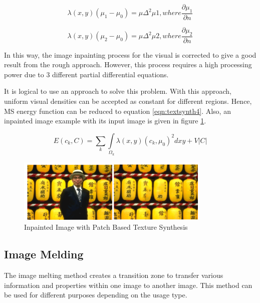 \begin{equation}
    \label{eqn:textsynth2}
    \lambda(x,y)(\mu_1-\mu_0)=\mu\Delta^2\mu1, where \frac{\partial\mu_1}{\partial n}
\end{equation}

\begin{equation}
    \label{eqn:textsynth3}
    \lambda(x,y)(\mu_2-\mu_0)=\mu\Delta^2\mu2, where \frac{\partial\mu_2}{\partial n}
\end{equation}

In this way, the image inpainting process for the visual is corrected to give a good result from the rough approach. However, this process requires a high processing power due to 3 different partial differential equations.

It is logical to use an approach to solve this problem. With this approach, uniform visual densities can be accepted as constant for different regions. Hence, MS energy function can be reduced to equation \ref{eqn:textsynth4}. Also, an inpainted image example with its input image is given in figure \ref{fig:patch-based-example}.

\begin{equation}
    \label{eqn:textsynth4}
    E(c_k, C) = \sum\limits_{k}\int\limits_{\Omega_k}\lambda(x,y){(c_k,\mu_0)}^2dxy+V|C|
\end{equation}

\begin{figure}[h]
    \centering
    \includegraphics{figures/chapter2/Patch-Based-texture-synth-example.png}
    \caption{Inpainted Image with Patch Based Texture Synthesis}
    \label{fig:patch-based-example}
\end{figure}

\subsection{Image Melding}

The image melting method \cite{imagemelding} creates a transition zone to transfer various information and properties within one image to another image. This method can be used for different purposes depending on the usage type.

